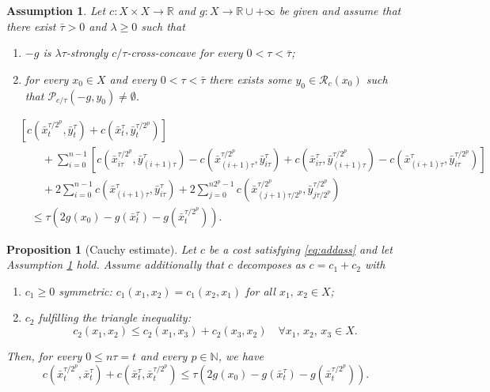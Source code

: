 \documentclass[10pt,a4paper]{amsart}
\newtheorem{assumption}{Assumption}
\newtheorem{proposition}{Proposition}
\newcommand{\N}{\mathbb{N}}
\newcommand{\R}{\mathbb{R}}
\newcommand{\YY}{X}
\begin{document}
\begin{assumption}\label{ass:ass1}  Let  $c:X \times \YY\to \R$ and $g: X \to \R \cup {+\infty}$  be given  and  assume   that there exist $\bar{\tau}>0$ and $\lambda \ge 0$ such that
\begin{enumerate}
\item $-g$ is $\lambda \tau$-strongly $c/\tau$-cross-concave for every $0<\tau< \bar{\tau}$;
\item for every $x_0 \in X$ and every $0< \tau<\bar{\tau}$ there exists some $y_0 \in \mathcal{R}_c(x_0)$ such that $\mathcal{P}_{c/\tau}(-g,y_0) \ne \emptyset$.
\end{enumerate}
\end{assumption}

    \begin{align}
&[c(\bar{x}_{t}^{\tau/2^p},\bar{y}_{t}^\tau)+c(\bar{x}_{t}^\tau,\bar{y}_{t}^{\tau/2^p})]\nonumber\\
 &  \qquad +\sum_{i=0}^{n-1}[c(\bar{x}_{i\tau}^{\tau/2^p},\bar{y}_{(i+1)\tau}^\tau)- c(\bar{x}_{(i+1)\tau}^{\tau/2^p},\bar{y}_{i\tau}^\tau) + c(\bar{x}_{i\tau}^\tau,\bar{y}_{(i+1)\tau}^{\tau/2^p})-c(\bar{x}_{(i+1)\tau}^\tau,\bar{y}_{i\tau}^{\tau/2^p})]\nonumber\\ 
 & \qquad  +2\sum_{i=0}^{n-1}c(\bar{x}_{(i+1)\tau}^\tau, \bar{y}_{i\tau}^\tau)+ 2\sum_{j=0}^{n2^p-1}c(\bar{x}_{(j+1)\tau/2^p}^{\tau/2^p}, \bar{y}_{j\tau/2^p}^{\tau/2^p})\nonumber\\
    & \quad \le \tau(2g(x_0)-g(\bar{x}_{t}^\tau)-g(\bar{x}_{t}^{\tau/2^p})).\label{eq:Cauchy_ineq_full}
\end{align}

\begin{proposition}[Cauchy estimate]\label{prop:cauchy}  Let $c$ be a cost satisfying \eqref{eq:addass}  and let  Assumption \ref{ass:ass1} hold. Assume additionally  that $c$     decomposes as $c=c_1+c_2$ with 
\begin{enumerate}
    \item  $c_1\geq 0$  symmetric: $c_1(x_1,x_2)=c_1(x_2,x_1)$ for all $x_1,\, x_2 \in X$;  
    \item $c_2$ fulfilling the triangle inequality: $$c_2(x_1,x_2)\leq c_2(x_1,x_3)+ c_2(x_3,x_2)\quad \forall x_1,\, x_2, \, x_3 \in X.$$  
\end{enumerate}
Then, for every $0 \le n \tau = t$ and every $p \in \N$, we have
\[ c(\bar{x}_{t}^{\tau/2^p},\bar{x}_{t}^\tau)+c(\bar{x}_{t}^\tau,\bar{x}_{t}^{\tau/2^p}) \le \tau(2g(x_0)-g(\bar{x}_{t}^\tau)-g(\bar{x}_{t}^{\tau/2^p})).\]
    
\end{proposition}
\end{document}
